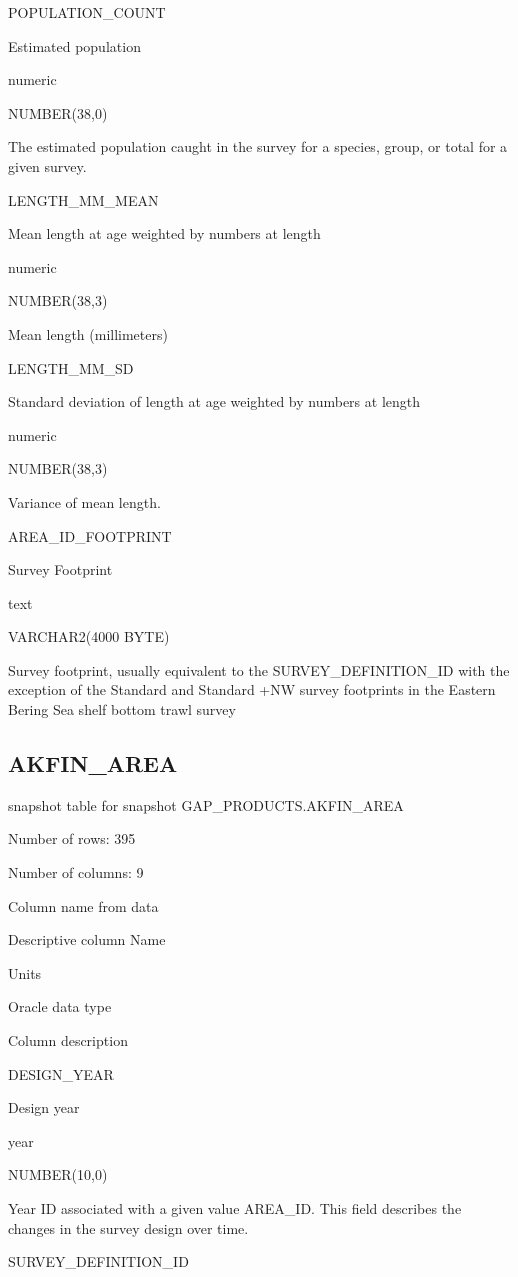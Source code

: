 \documentclass[
  letterpaper,
  oneside,
  open=any]{scrbook}
\begin{document}
POPULATION\_COUNT

Estimated population

numeric

NUMBER(38,0)

The estimated population caught in the survey for a species, group, or
total for a given survey.

LENGTH\_MM\_MEAN

Mean length at age weighted by numbers at length

numeric

NUMBER(38,3)

Mean length (millimeters)

LENGTH\_MM\_SD

Standard deviation of length at age weighted by numbers at length

numeric

NUMBER(38,3)

Variance of mean length.

AREA\_ID\_FOOTPRINT

Survey Footprint

text

VARCHAR2(4000 BYTE)

Survey footprint, usually equivalent to the SURVEY\_DEFINITION\_ID with
the exception of the Standard and Standard +NW survey footprints in the
Eastern Bering Sea shelf bottom trawl survey

\subsection{AKFIN\_AREA}\label{akfin_area}

snapshot table for snapshot GAP\_PRODUCTS.AKFIN\_AREA

Number of rows: 395

Number of columns: 9

Column name from data

Descriptive column Name

Units

Oracle data type

Column description

DESIGN\_YEAR

Design year

year

NUMBER(10,0)

Year ID associated with a given value AREA\_ID. This field describes the
changes in the survey design over time.

SURVEY\_DEFINITION\_ID
\end{document}

